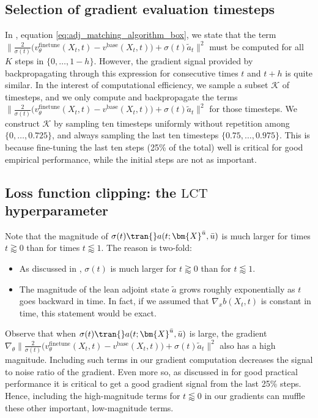 \subsection{Selection of gradient evaluation timesteps} \label{subsec:timestep_selection}
In , equation \eqref{eq:adj_matching_algorithm_box}, we state that the term $\big\|\frac{2}{\sigma(t)} \big(v^{\mathrm{finetune}}_{\theta}(X_t, t) - v^{\mathrm{base}}(X_t, t) \big) + \sigma(t) \tilde{a}_t \big\|^2$ must be computed for all $K$ steps in $\{0, \dots, 1-h\}$. However, the gradient signal provided by backpropagating through this expression for consecutive times $t$ and $t+h$ is quite similar. In the interest of computational efficiency, we sample a subset $\mathcal{K}$ of timesteps, and we only compute and backpropagate the terms $\big\|\frac{2}{\sigma(t)} \big(v^{\mathrm{finetune}}_{\theta}(X_t, t) - v^{\mathrm{base}}(X_t, t) \big) + \sigma(t) \tilde{a}_t \big\|^2$ for those timesteps. We construct $\mathcal{K}$ by sampling ten timesteps uniformly without repetition among $\{0, \dots, 0.725\}$, and always sampling the last ten timesteps $\{0.75, \dots, 0.975\}$. This is because fine-tuning the last ten steps (25\% of the total) well is critical for good empirical performance, while the initial steps are not as important.

\subsection{Loss function clipping: the $\mathrm{LCT}$ hyperparameter}
Note that the magnitude of $\sigma(t)\tran{} a(t;\bm{X}^{\bar{u}},\bar{u})$ is much larger for times $t \gtrapprox 0$ than for times $t \lessapprox 1$. The reason is two-fold: 
\begin{itemize}
    \item As discussed in , $\sigma(t)$ is much larger for $t \gtrapprox 0$ than for $t \lessapprox 1$.
    \item The magnitude of the lean adjoint state $\tilde{a}$ grows roughly exponentially as $t$ goes backward in time. In fact, if we assumed that $\nabla_x b(X_t,t)$ is constant in time, this statement would be exact.
\end{itemize}
Observe that when $\sigma(t)\tran{} a(t;\bm{X}^{\bar{u}},\bar{u})$ is large, the gradient $\nabla_{\theta} \big\|\frac{2}{\sigma(t)} \big(v^{\mathrm{finetune}}_{\theta}(X_t, t) - v^{\mathrm{base}}(X_t, t) \big) + \sigma(t) \tilde{a}_t \big\|^2$ also has a high magnitude. Including such terms in our gradient computation decreases the signal to noise ratio of the gradient. Even more so, as discussed in  for good practical performance it is critical to get a good gradient signal from the last 25\% steps. Hence, including the high-magnitude terms for $t \lessapprox 0$ in our gradients can muffle these other important, low-magnitude terms.

